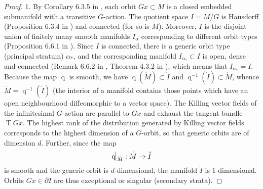 \documentclass{article}
\begin{document}
\begin{proof} 1. By Corollary 6.3.5 in \cite{RudolphSchmidt2013}, each orbit $Gx\subset M$ is a closed embedded submanifold with a transitive $G$-action. The quotient space $I=M/G$ is Hausdorff (Proposition 6.3.4 in \cite{RudolphSchmidt2013}) and connected (for so is $M$). Moreover, $I$ is the disjoint union of finitely many smooth manifolds $I_\alpha$ corresponding to different orbit types (Proposition 6.6.1 in \cite{RudolphSchmidt2013}). Since $I$ is connected, there is a generic orbit type (principal stratum) $\alpha_*$, and the corresponding manifold $I_{\alpha_*}\subset I$ is open, dense and connected (Remark 6.6.2 in \cite{RudolphSchmidt2013}, Theorem 4.3.2 in \cite{Pflaum2001}), which means that $I_{\alpha_*}=\mathring I$. Because the map $\operatorname{q}$ is smooth, we have $\operatorname{q}(\mathring M)\subset\mathring I$ and $\operatorname{q}^{-1}(\mathring I)\subset\mathring M$, whence $\mathring M=\operatorname{q}^{-1}(\mathring I)$ (the interior of a manifold contains those points which have an open neighbourhood diffeomorphic to a vector space). The Killing vector fields of the infinitesimal $G$-action are parallel to $Gx$ and exhaust the tangent bundle $\operatorname{T}Gx$. The highest rank of the distribution generated by Killing vector fields corresponds to the highest dimension of a $G$-orbit, so that generic orbits are of dimension $d$. Further, since the map
$$
\operatorname{q}\vline_{\mathring M}:\mathring M\to\mathring I
$$
is smooth and the generic orbit is $d$-dimensional, the manifold $\mathring I$ is 1-dimensional. Orbits $Gx\in\partial I$ are thus exceptional or singular (secondary strata).


\end{proof}
\end{document}
